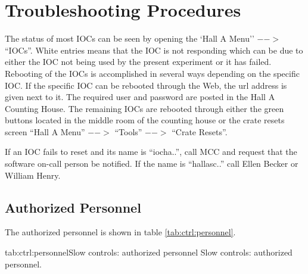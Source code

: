 {{\section{Troubleshooting Procedures}
The status of most IOCs can be seen
by opening the `Hall A Menu'' $-->$ ``IOCs''. White entries means that the IOC
is not responding which can be due to either the IOC not being used by the present
experiment or it has failed. Rebooting of the IOCs is accomplished in several ways
depending on the specific IOC. If the specific IOC can be rebooted through the
Web, the url address is given next to it. The required user and password are
posted in the Hall A Counting House. The remaining IOCs are rebooted through
either the green buttons located in the middle room of the counting house
or the crate resets screen ``Hall A Menu'' $-->$ ``Tools'' $-->$ ``Crate Resets''.

If an IOC fails to reset and its name is ``iocha..'', call MCC and request that
the software on-call person be notified. If the name is ``hallasc..'' call Ellen Becker or William Henry. 

} %

\infolevltone{\newpage}
\begin{safetyen}{10}{15}
\subsection{Authorized  Personnel} 
\end{safetyen}
The authorized personnel is shown in table \ref{tab:ctrl:personnel}.
\begin{namestab}{tab:ctrl:personnel}{Slow controls: authorized personnel}{%
      Slow controls: authorized personnel.}
  \EllenBecker{}
  \WilliamHenry{}
\end{namestab}

}


